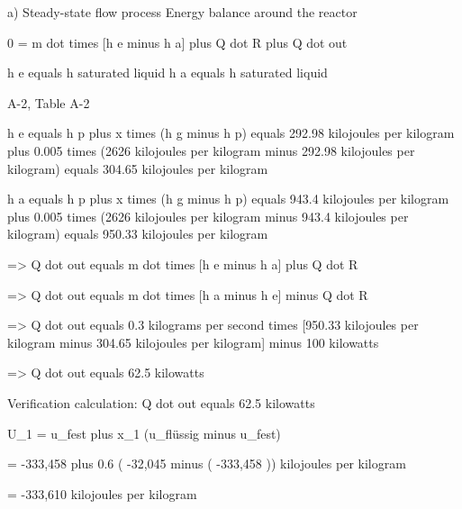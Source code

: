 a) Steady-state flow process  
Energy balance around the reactor  

0 = m dot times [h e minus h a] plus Q dot R plus Q dot out  

h e equals h saturated liquid  
h a equals h saturated liquid  

A-2, Table A-2  

h e equals h p plus x times (h g minus h p)  
equals 292.98 kilojoules per kilogram plus 0.005 times (2626 kilojoules per kilogram minus 292.98 kilojoules per kilogram)  
equals 304.65 kilojoules per kilogram  

h a equals h p plus x times (h g minus h p)  
equals 943.4 kilojoules per kilogram plus 0.005 times (2626 kilojoules per kilogram minus 943.4 kilojoules per kilogram)  
equals 950.33 kilojoules per kilogram  

=> Q dot out equals m dot times [h e minus h a] plus Q dot R  

=> Q dot out equals m dot times [h a minus h e] minus Q dot R  

=> Q dot out equals 0.3 kilograms per second times [950.33 kilojoules per kilogram minus 304.65 kilojoules per kilogram] minus 100 kilowatts  

=> Q dot out equals 62.5 kilowatts  

Verification calculation: Q dot out equals 62.5 kilowatts

U_1 = u_fest plus x_1 (u_flüssig minus u_fest)  

= -333,458 plus 0.6 ( -32,045 minus ( -333,458 )) kilojoules per kilogram  

= -333,610 kilojoules per kilogram